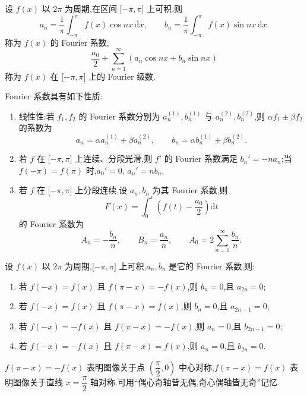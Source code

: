 \documentclass[../数学分析培优讲义.tex]{subfiles}
\begin{document}
设 $f(x)$ 以 $2\pi$ 为周期,在区间 $\lbrack -\pi,\pi\rbrack$ 上可积,则
\[
    a_n=\dfrac{1}{\pi}\int_{-\pi}^{\pi}f(x)\cos nx\,\mathrm{d}x,
    \qquad
    b_n=\dfrac{1}{\pi}\int_{-\pi}^{\pi}f(x)\sin nx\,\mathrm{d}x.
\]
称为 $f(x)$ 的 Fourier 系数,
\[
    \dfrac{a_0}{2}+\sum\limits_{n=1}^{\infty}(a_n\cos nx+b_n\sin nx)
\]
称为 $f(x)$ 在 $\lbrack -\pi,\pi\rbrack$ 上的 Fourier 级数.

\begin{proposition}[\markstar]
Fourier 系数具有如下性质:
\begin{enumerate}[label=(\arabic*)]
    \item 线性性:若 $f_1,f_2$ 的 Fourier 系数分别为 $a_n^{(1)},b_n^{(1)}$ 与 $a_n^{(2)},b_n^{(2)}$,则 $\alpha f_1\pm\beta f_2$ 的系数为
    \[
        a_n=\alpha a_n^{(1)}\pm\beta a_n^{(2)},
        \qquad
        b_n=\alpha b_n^{(1)}\pm\beta b_n^{(2)}.
    \]
    \item 若 $f$ 在 $\lbrack -\pi,\pi\rbrack$ 上连续、分段光滑,则 $f'$ 的 Fourier 系数满足 $b_n'=-na_n$;当 $f(-\pi)=f(\pi)$ 时,$a_0'=0$, $a_n'=nb_n$.
    \item 若 $f$ 在 $\lbrack -\pi,\pi\rbrack$ 上分段连续,设 $a_n,b_n$ 为其 Fourier 系数,则
    \[
        F(x)=\int_0^x\left(f(t)-\dfrac{a_0}{2}\right)\mathrm{d}t
    \]
    的 Fourier 系数为
    \[
        A_n=-\dfrac{b_n}{n},
        \qquad
        B_n=\dfrac{a_n}{n},
        \qquad
        A_0=2\sum\limits_{n=1}^{\infty}\dfrac{b_n}{n}.
    \]
\end{enumerate}
\end{proposition}

\begin{proposition}[\markstar]
设 $f(x)$ 以 $2\pi$ 为周期,$\lbrack -\pi,\pi\rbrack$ 上可积,$a_n,b_n$ 是它的 Fourier 系数,则:
\begin{enumerate}[label=(\arabic*)]
    \item 若 $f(-x)=f(x)$ 且 $f(\pi-x)=-f(x)$,则 $b_n=0$,且 $a_{2n}=0$;
    \item 若 $f(-x)=f(x)$ 且 $f(\pi-x)=f(x)$,则 $b_n=0$,且 $a_{2n-1}=0$;
    \item 若 $f(-x)=-f(x)$ 且 $f(\pi-x)=-f(x)$,则 $a_n=0$,且 $b_{2n-1}=0$;
    \item 若 $f(-x)=-f(x)$ 且 $f(\pi-x)=f(x)$,则 $a_n=0$,且 $b_{2n}=0$.
\end{enumerate}
\end{proposition}

\begin{remark}
$f(\pi-x)=-f(x)$ 表明图像关于点 $\left(\dfrac{\pi}{2},0\right)$ 中心对称,$f(\pi-x)=f(x)$ 表明图像关于直线 $x=\dfrac{\pi}{2}$ 轴对称.可用``偶心奇轴皆无偶,奇心偶轴皆无奇''记忆.
\end{remark}
\end{document}
